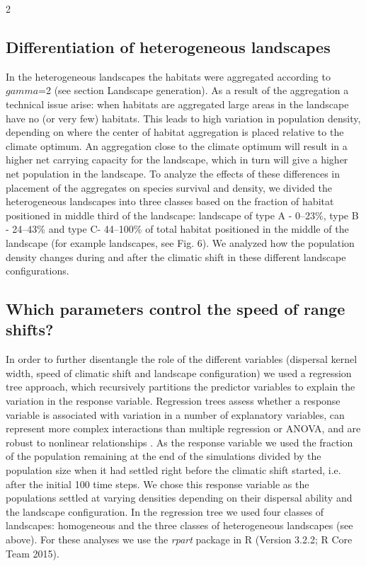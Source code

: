 \documentclass[12pt,pdftex]{article}
\begin{document}
\begin{spacing}{2}
\subsection*{Differentiation of heterogeneous landscapes}
In the heterogeneous landscapes the habitats were aggregated according to $gamma$=2 (see section Landscape generation). As a result of the aggregation a technical issue arise: when habitats are aggregated large areas in the landscape have no (or very few) habitats. This leads to high variation in population density, depending on where the center of habitat aggregation is placed relative to the climate optimum. An aggregation close to the climate optimum will result in a higher net carrying capacity for the landscape, which in turn will give a higher net population in the landscape. To analyze the effects of these differences in placement of the aggregates on species survival and density, we divided the heterogeneous landscapes into three classes based on the fraction of habitat positioned in middle third of the landscape:  landscape of type A - 0--23\%, type B - 24--43\%  and type C- 44--100\% of total habitat positioned in the middle of the landscape (for example landscapes, see Fig. 6). We analyzed how the population density changes during and after the climatic shift in these different landscape configurations. 

\subsection*{Which parameters control the speed of range shifts?} 
In order to further disentangle the role of the different variables (dispersal kernel width, speed of climatic shift and landscape configuration) we used a regression tree approach, which recursively partitions the predictor variables to explain the variation in the response variable. Regression trees assess whether a response variable is associated with variation in a number of explanatory variables, can represent more complex interactions than multiple regression or ANOVA, and are robust to nonlinear relationships \citep{Death2000, Brose2005a}. As the response variable we used the fraction of the population remaining at the end of the simulations divided by the population size when it had settled right before the climatic shift started, i.e. after the initial 100 time steps. We chose this response variable as the populations settled at varying densities depending on their dispersal ability and the landscape configuration. In the regression tree we used four classes of landscapes: homogeneous and the three classes of heterogeneous landscapes (see above). For these analyses we use the {\em rpart} package in \textsf{R} (Version 3.2.2; R Core Team 2015). 




\end{spacing}
\end{document}
